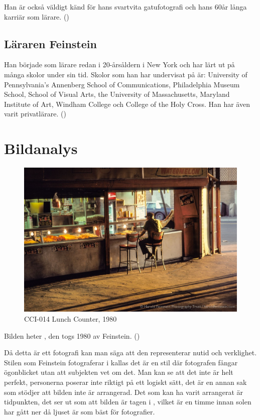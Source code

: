 \documentclass{article}
\begin{document}
Han är också väldigt känd för hans svartvita gatufotografi och hans 60år långa karriär som lärare. (\textcite{harsite18}) 

\subsection{Läraren Feinstein}
Han började som lärare redan i 20-årsåldern i New York och har lärt ut på många skolor under sin tid. Skolor som han har undervisat
på är: University of Pennsylvania’s Annenberg School of Communications, Philadelphia Museum School, School of Visual Arts, the University of Massachusetts, Maryland Institute of Art, Windham College och College of the Holy Cross. 
Han har även varit privatlärare. (\textcite{harsite18})
\newpage

\section{Bildanalys}

\begin{figure}
  \includegraphics[width=\linewidth]{bildforanalys.jpg}
  \caption{CCI-014 Lunch Counter, 1980}
\end{figure}


Bilden heter , den togs 1980 av Feinstein. (\textcite{harsite18})

Då detta är ett fotografi kan man säga att den representerar nutid och verklighet.
Stilen som Feinstein fotograferar i kallas  det är en stil där fotografen fångar ögonblicket utan att subjekten vet om det.
Man kan se att det inte är helt perfekt, personerna poserar inte riktigt på ett logiskt sätt, det är en annan sak som stödjer att bilden inte är arrangerad.
Det som kan ha varit arrangerat är tidpunkten, det ser ut som att bilden är tagen i , vilket är en timme innan solen har gått ner
då ljuset är som bäst för fotografier.
\end{document}
